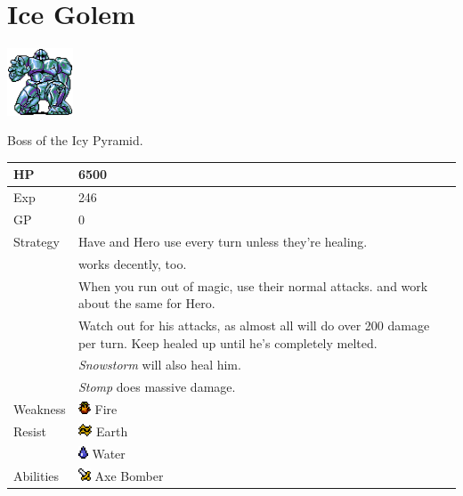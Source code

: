 \section{Ice Golem}
\label{monster:ice_golem}

\includegraphics[height=2cm,keepaspectratio]{./resources/monster/ice_golem}

Boss of the Icy Pyramid.

\begin{longtable}{ l p{9cm} }
	HP
	& 6500
\\ \hline
	Exp
	& 246
\\ \hline
	GP
	& 0
\\ \hline
	Strategy
	& Have \nameref{char:phoebe} and Hero use \nameref{spell:fire} every turn unless they’re healing. \\
	& \nameref{spell:thunder} works decently, too. \\
	& When you run out of magic, use their normal attacks. \nameref{weapon:bomb} and \nameref{weapon:steel_sword} work about the same for Hero. \\
	& Watch out for his attacks, as almost all will do over 200 damage per turn. Keep healed up until he’s completely melted. \\
	& \textit{Snowstorm} will also heal him. \\
	& \textit{Stomp} does massive damage.
\\ \hline
	Weakness
	& \includegraphics[height=1em,keepaspectratio]{./resources/effects/fire} Fire
\\ \hline
	Resist
	& \includegraphics[height=1em,keepaspectratio]{./resources/effects/earth} Earth \\
	& \includegraphics[height=1em,keepaspectratio]{./resources/effects/water} Water
\\ \hline
	Abilities
	& \includegraphics[height=1em,keepaspectratio]{./resources/effects/damage} Axe Bomber \\

\end{longtable}
